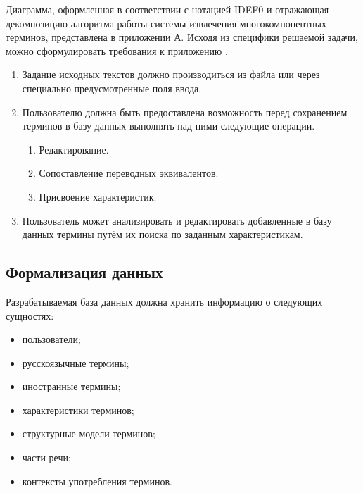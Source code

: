Диаграмма, оформленная в соответствии с нотацией IDEF0 и отражающая декомпозицию алгоритма работы системы извлечения многокомпонентных терминов, представлена в приложении А. Исходя из специфики решаемой задачи, можно сформулировать требования к приложению \cite{My_article_2022}.


\begin{enumerate}[label*=\arabic*.]
	\item Задание исходных текстов должно производиться из файла или через специально предусмотренные поля ввода.
	\item Пользователю должна быть предоставлена возможность перед сохранением терминов в базу данных выполнять над ними следующие операции.
	
	\begin{enumerate}[label*=\arabic*.]
		\item Редактирование.
		\item Сопоставление переводных эквивалентов.
		\item Присвоение характеристик.
		
	\end{enumerate}

	\item Пользователь может анализировать и редактировать добавленные в базу данных термины путём их поиска по заданным характеристикам.
	
\end{enumerate}



\subsection{Формализация данных}

Разрабатываемая база данных должна хранить информацию о следующих сущностях:

\begin{itemize}[label*=---]
	\item пользователи;
	\item русскоязычные термины;
	\item иностранные термины;
	\item характеристики терминов;
	\item структурные модели терминов;
	\item части речи;
	\item контексты употребления терминов.

\end{itemize}

